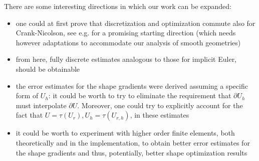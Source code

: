 \documentclass[english,a4paper,9pt,oneside]{scrbook}	%
\theoremstyle{break}
\theoremstyle{remark}
\begin{document}
There are some interesting directions in which our work can be expanded:

\begin{itemize}
	\item one could at first prove that discretization and optimization commute also for Crank-Nicolson, see e.g. \cite{flaig} for a promising starting direction (which needs however adaptations to accommodate our analysis of smooth geometries)
	\item from here, fully discrete estimates analogous to those for implicit Euler, should be obtainable
	\item the error estimates for the shape gradients were derived assuming a specific form of $U_h$: it could be worth to try to eliminate the requirement that $\partial U_h$ must interpolate $\partial U$. Moreover, one could try to explicitly account for the fact that $U=\tau (U_r), U_h = \tau(U_{r,h})$, in these estimates
	\item it could be worth to experiment with higher order finite elements, both theoretically and in the implementation, to obtain better error estimates for the shape gradients and thus, potentially, better shape optimization results
\end{itemize}
\end{document}
